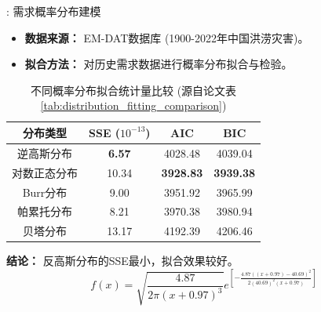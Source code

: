 \documentclass[9pt]{beamer}
\begin{document}
\begin{frame}{\insertsectionhead: 需求概率分布建模}
    \begin{itemize}
        \item \textbf{数据来源：} EM-DAT数据库 (1900-2022年中国洪涝灾害)。
        \item \textbf{拟合方法：} 对历史需求数据进行概率分布拟合与检验。
    \end{itemize}
    \begin{table}
    \centering
    \caption{不同概率分布拟合统计量比较 (源自论文表 \ref{tab:distribution_fitting_comparison})}
        \small
\begin{tabular}{cccc}
    \toprule
    分布类型    & SSE ($10^{-13}$) & AIC        & BIC \\
    \midrule
    逆高斯分布 & \textbf{6.57}    & 4028.48    & 4039.04\\
    对数正态分布 & 10.34            & \textbf{3928.83}    & \textbf{3939.38}\\
    Burr分布      & 9.00             & 3951.92    & 3965.99   \\
    帕累托分布   & 8.21             & 3970.38    & 3980.94   \\
    贝塔分布      & 13.17            & 4192.39    & 4206.46   \\
    \bottomrule
    \end{tabular}
    \end{table}
    \textbf{结论：} 反高斯分布的SSE最小，拟合效果较好。
    \begin{equation} \label{eq:beamer_pdf_demand}
    f(x) = \sqrt{\frac{4.87}{2\pi (x + 0.97)^3}} e^{\left[ -\frac{4.87 \left((x + 0.97) - 40.69\right)^2}{2(40.69)^2 (x + 0.97)} \right]}
    \end{equation}
\end{frame}
\end{document}
